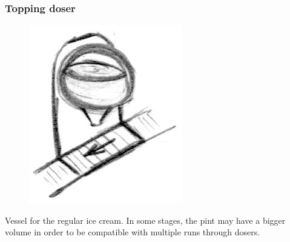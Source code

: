 \documentclass[a4paper]{scrartcl}
\begin{document}
        \subsubsection{Topping doser}
            \begin{minipage}[t][6em][t]{\textwidth}
                \begin{figure}
                    \vspace{-20pt}
                    \includegraphics[scale=1]{devices/topping_doser}
                    \vspace{-10pt}
                \end{figure}

                Vessel for the regular ice cream. In some stages, the pint may have
                a bigger volume in order to be compatible with multiple runs through
                dosers.
            \end{minipage}
\end{document}
